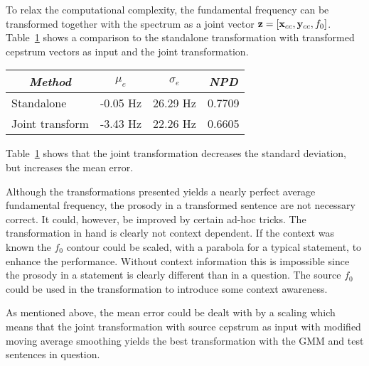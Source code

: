 To relax the computational complexity, the fundamental frequency can be transformed together with the spectrum as a joint vector $\mathbf{z} = \left[\mathbf{x}_{cc},\mathbf{y}_{cc},f_0\right]$. Table~\ref{tab:f0_joint_transform} shows a comparison to the standalone transformation with transformed cepstrum vectors as input and the joint transformation.
\begin{table}[htbp]
	\begin{center}
		\label{tab:f0_joint_transform}
		\begin{tabular}{lrrr}
			\toprule
			\multicolumn{1}{c}{\emph{Method}} & \multicolumn{1}{c}{\emph{$\mu_e$}} & \multicolumn{1}{c}{\emph{$\sigma_e$}} & \multicolumn{1}{c}{\emph{NPD}}\\
			\midrule
			Standalone & -0.05 Hz & 26.29 Hz & 0.7709\\
			Joint transform & -3.43 Hz & 22.26 Hz & 0.6605\\
			\bottomrule			
		\end{tabular}		
	\end{center}	
\end{table}
Table~\ref{tab:f0_joint_transform} shows that the joint transformation decreases the standard deviation, but increases the mean error. 

Although the transformations presented yields a nearly perfect average fundamental frequency, the prosody in a transformed sentence are not necessary correct. It could, however, be improved by certain ad-hoc tricks. The transformation in hand is clearly not context dependent. If the context was known the $f_0$ contour could be scaled, with \eg a parabola for a typical statement, to enhance the performance. Without context information this is impossible since the prosody in a statement is clearly different than in a question. The source $f_0$ could be used in the transformation to introduce some context awareness. 

As mentioned above, the mean error could be dealt with by a scaling which means that the joint transformation with source cepstrum as input with modified moving average smoothing yields the best transformation with the GMM and test sentences in question.

